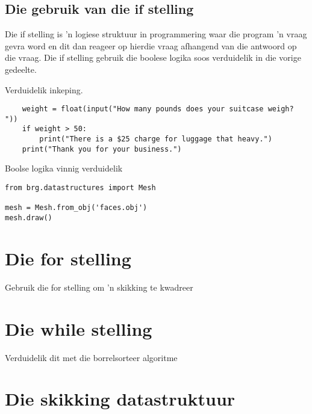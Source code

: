 \section{Die gebruik van die if stelling}
Die if stelling is 'n logiese struktuur in programmering waar die program 'n vraag gevra word en dit dan reageer op hierdie vraag afhangend van die antwoord op die vraag.  Die if stelling gebruik die boolese logika soos verduidelik in die vorige gedeelte.

Verduidelik inkeping.


\lstset{language=Python}
\lstset{frame=lines}
\lstset{basicstyle=\footnotesize}
\begin{lstlisting}
    weight = float(input("How many pounds does your suitcase weigh? "))
    if weight > 50:
        print("There is a $25 charge for luggage that heavy.")
    print("Thank you for your business.")
\end{lstlisting}

Boolse logika vinnig verduidelik



\lstset{language=Python}
\lstset{frame=lines}
\lstset{basicstyle=\footnotesize}
\begin{lstlisting}
from brg.datastructures import Mesh
 
mesh = Mesh.from_obj('faces.obj')
mesh.draw()
\end{lstlisting}




\chapter[Die for stelling]
{Die for stelling}

Gebruik die for stelling om 'n skikking te kwadreer


\chapter[Die while stelling]
{Die while stelling}

Verduidelik dit met die borrelsorteer algoritme


\chapter[Skikkings en lyste]
{Die skikking datastruktuur}

